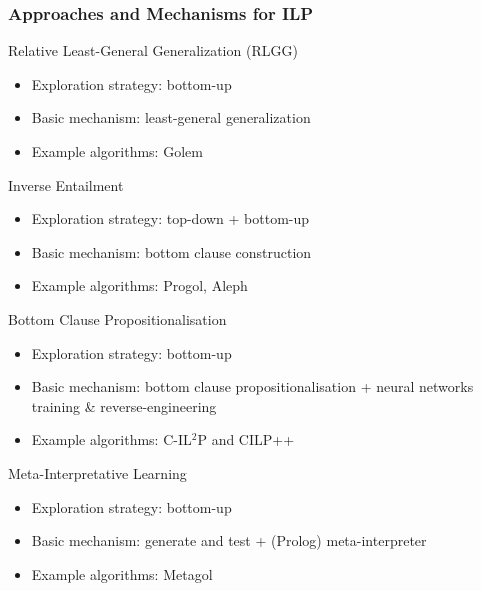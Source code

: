 \documentclass[presentation]{beamer}\mode<presentation>{\usetheme{AMSBolognaFC}}
\begin{document}
\begin{frame}[allowframebreaks]
    \frametitle{Approaches and Mechanisms for ILP}

    \begin{block}{Relative Least-General Generalization (RLGG) \cite{Buntine88}}
        \begin{itemize}
            \item Exploration strategy: bottom-up
            \item Basic mechanism: \alert{least-general generalization}
            \item Example algorithms: Golem
        \end{itemize}
    \end{block}

    \begin{block}{Inverse Entailment \cite{Muggleton95}}
        \begin{itemize}
            \item Exploration strategy: top-down + bottom-up
            \item Basic mechanism: \alert{bottom clause construction}
            \item Example algorithms: Progol, Aleph
        \end{itemize}
    \end{block}

    \begin{block}{Bottom Clause Propositionalisation \cite{Franca2014}}
        \begin{itemize}
            \item Exploration strategy: bottom-up
            \item Basic mechanism: \alert{bottom clause propositionalisation} + neural networks training \& reverse-engineering
            \item Example algorithms: C-IL$^2$P and CILP++
        \end{itemize}
    \end{block}

    \begin{block}{Meta-Interpretative Learning \cite{MuggletonLPT14}}
        \begin{itemize}
            \item Exploration strategy: bottom-up
            \item Basic mechanism: \alert{generate and test} + (Prolog) \alert{meta-interpreter}
            \item Example algorithms: Metagol
        \end{itemize}
    \end{block}
\end{frame}
\end{document}
